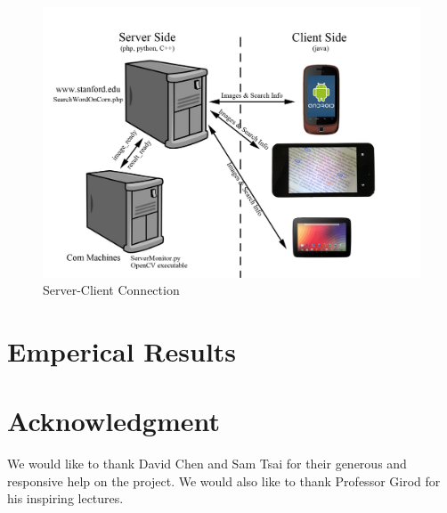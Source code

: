 \documentclass[conference]{IEEEtran}
\begin{document}
\begin{figure}
\center
\includegraphics[scale=0.15]{server_client_connection.jpg}
\caption{Server-Client Connection}
\label{server_client}
\end{figure}


\section{Emperical Results}

\section*{Acknowledgment}
We would like to thank David Chen and Sam Tsai for their generous and responsive help on the project.  We would also like to thank Professor Girod for his inspiring lectures.


\end{document}

